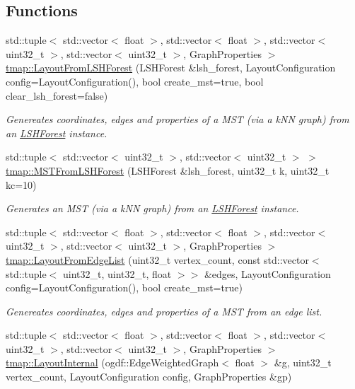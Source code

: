 \subsection*{Functions}
\begin{DoxyCompactItemize}
\item 
std\+::tuple$<$ std\+::vector$<$ float $>$, std\+::vector$<$ float $>$, std\+::vector$<$ uint32\+\_\+t $>$, std\+::vector$<$ uint32\+\_\+t $>$, Graph\+Properties $>$ \hyperlink{layout_8hh_a1b41a97f59e18234250f76085a7d437b}{tmap\+::\+Layout\+From\+L\+S\+H\+Forest} (L\+S\+H\+Forest \&lsh\+\_\+forest, Layout\+Configuration config=Layout\+Configuration(), bool create\+\_\+mst=true, bool clear\+\_\+lsh\+\_\+forest=false)
\begin{DoxyCompactList}\small\item\em Genereates coordinates, edges and properties of a M\+ST (via a k\+NN graph) from an \hyperlink{classtmap_1_1LSHForest}{L\+S\+H\+Forest} instance. \end{DoxyCompactList}\item 
std\+::tuple$<$ std\+::vector$<$ uint32\+\_\+t $>$, std\+::vector$<$ uint32\+\_\+t $>$ $>$ \hyperlink{layout_8hh_a033d33fa567d893125d956e56933335f}{tmap\+::\+M\+S\+T\+From\+L\+S\+H\+Forest} (L\+S\+H\+Forest \&lsh\+\_\+forest, uint32\+\_\+t k, uint32\+\_\+t kc=10)
\begin{DoxyCompactList}\small\item\em Generates an M\+ST (via a k\+NN graph) from an \hyperlink{classtmap_1_1LSHForest}{L\+S\+H\+Forest} instance. \end{DoxyCompactList}\item 
std\+::tuple$<$ std\+::vector$<$ float $>$, std\+::vector$<$ float $>$, std\+::vector$<$ uint32\+\_\+t $>$, std\+::vector$<$ uint32\+\_\+t $>$, Graph\+Properties $>$ \hyperlink{layout_8hh_a780993ad8dd7e349b77f55895cc33451}{tmap\+::\+Layout\+From\+Edge\+List} (uint32\+\_\+t vertex\+\_\+count, const std\+::vector$<$ std\+::tuple$<$ uint32\+\_\+t, uint32\+\_\+t, float $>$$>$ \&edges, Layout\+Configuration config=Layout\+Configuration(), bool create\+\_\+mst=true)
\begin{DoxyCompactList}\small\item\em Genereates coordinates, edges and properties of a M\+ST from an edge list. \end{DoxyCompactList}\item 
std\+::tuple$<$ std\+::vector$<$ float $>$, std\+::vector$<$ float $>$, std\+::vector$<$ uint32\+\_\+t $>$, std\+::vector$<$ uint32\+\_\+t $>$, Graph\+Properties $>$ \hyperlink{layout_8hh_a126dbc6ec8355732c528abb2877e60d4}{tmap\+::\+Layout\+Internal} (ogdf\+::\+Edge\+Weighted\+Graph$<$ float $>$ \&g, uint32\+\_\+t vertex\+\_\+count, Layout\+Configuration config, Graph\+Properties \&gp)
$$
\end{DoxyCompactItemize}
